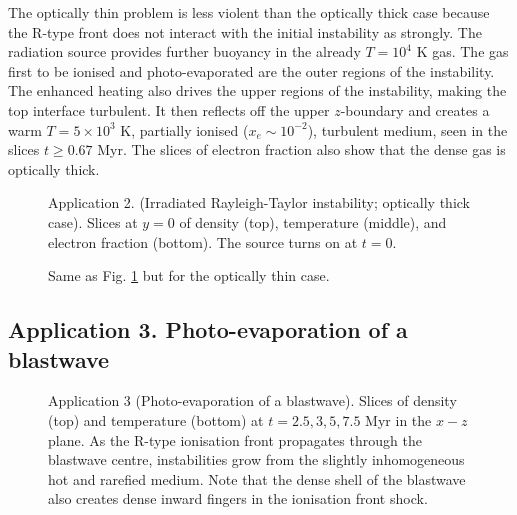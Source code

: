 \documentclass[useAMS,usenatbib]{mn2e}
\begin{document}
The optically thin problem is less violent than the optically thick
case because the R-type front does not interact with the initial
instability as strongly.  The radiation source provides further
buoyancy in the already $T=10^4$ K gas.  The gas first to be ionised
and photo-evaporated are the outer regions of the instability.  The
enhanced heating also drives the upper regions of the instability,
making the top interface turbulent.  It then reflects off the upper
$z$-boundary and creates a warm $T = 5 \times 10^3$ K, partially
ionised ($x_e \sim 10^{-2}$), turbulent medium, seen in the slices $t
\ge 0.67$ Myr.  The slices of electron fraction also show that the
dense gas is optically thick.

\begin{figure}
  \caption{\label{fig:test9_thick} Application 2. (Irradiated Rayleigh-Taylor
    instability; optically thick case).  Slices at $y=0$ of density
    (top), temperature (middle), and electron fraction (bottom).  The
    source turns on at $t=0$.}
\end{figure}

\begin{figure}
  \caption{\label{fig:test9_thin} Same as Fig. \ref{fig:test9_thick}
    but for the optically thin case.}
\end{figure}

\subsection{Application 3. Photo-evaporation of a blastwave}

\begin{figure*}
  \caption{\label{fig:test10} Application 3 (Photo-evaporation of a
    blastwave).  Slices of density (top) and temperature (bottom) at
    $t = 2.5, 3, 5, 7.5$ Myr in the $x-z$ plane.  As the R-type
    ionisation front propagates through the blastwave centre,
    instabilities grow from the slightly inhomogeneous hot and rarefied
    medium.  Note that the dense shell of the blastwave also creates
    dense inward fingers in the ionisation front shock.}
\end{figure*}
\end{document}
